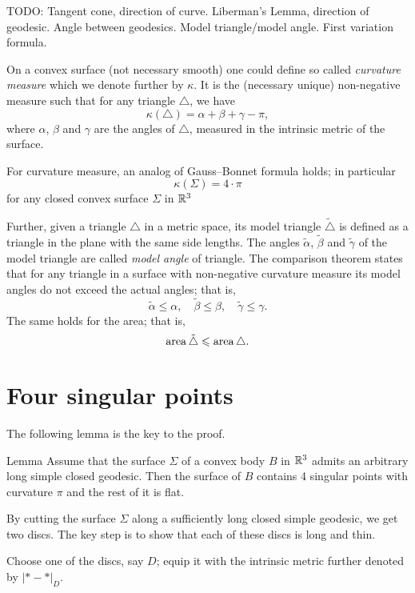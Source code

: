 \documentclass[oneside,a4paper]{article}
\begin{document}
TODO: Tangent cone, direction of curve.
Liberman's Lemma, direction of geodesic.
Angle between geodesics.
Model triangle/model angle.
First variation formula.


On a convex surface (not necessary smooth) one could define 
so
called \emph{curvature measure} which we denote further by $\kappa$.
It is the (necessary unique) non-negative measure such that for any triangle $\triangle$, we have
\[\kappa(\triangle)=\alpha+\beta+\gamma-\pi,\] 
where $\alpha$, $\beta$ and $\gamma$ are the angles of $\triangle$, measured in the intrinsic metric of the surface.

For curvature measure, an analog of Gauss--Bonnet formula holds;
in particular
\[\kappa(\Sigma)=4\cdot\pi\]
for any closed convex surface $\Sigma$ in $\mathbb{R}^3$


Further, given a triangle $\triangle$ in a metric space,
its model triangle $\tilde \triangle$ is defined as a triangle in the plane with the same side lengths.
The angles $\tilde\alpha$, $\tilde\beta$ and $\tilde\gamma$ of the model triangle are called \emph{model angle}
of triangle.
The comparison theorem states that for any triangle in a surface with non-negative curvature measure its model angles do not exceed the actual angles; that is,
\[\tilde\alpha\le \alpha,\quad
\tilde\beta\le\beta,\quad
\tilde\gamma\le\gamma.\]
The same holds for the area; that is,
\[\mathop{\rm area}\nolimits\tilde\triangle\leqslant \mathop{\rm area}\nolimits\triangle.\]

\section{Four singular points}

The following lemma is the key to the proof.

\begin{thm}{Lemma} 
Assume that the surface $\Sigma$ of a convex body $B$ in $\mathbb{R}^3$
admits an arbitrary long simple closed geodesic.
Then the surface of $B$ contains 4 singular points with curvature $\pi$ and the rest of it is flat.
\end{thm}


By cutting the surface $\Sigma$ along a sufficiently long closed simple geodesic,
we get two discs.
The key step is to show that each of these discs 
is long and thin.

\medskip

Choose one of the discs, say $D$;
equip it with the intrinsic metric further denoted by $|{*}-{*}|_D$.
\end{document}
